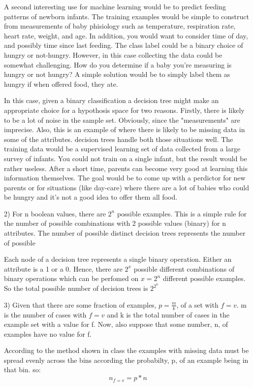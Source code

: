 \documentclass[12pt]{article}
\begin{document}
A second interesting use for machine learning would be to predict feeding patterns 
of newborn infants. The training examples would be simple to construct from measurements
of baby phisiology such as temperature, respiration rate, heart rate, weight, and age. 
In addition, you would want to consider time of day, and possibly time since last feeding. 
The class label could be a binary choice of hungry or not-hungry. However, in this case
collecting the data could be somewhat challenging. How do you determine if a baby you're 
measuring is hungry or not hungry? A simple solution would be to simply label them as hungry
if when offered food, they ate. 

In this case, given a binary classification a decision tree might make an appropriate 
choice for a hypothosis space for two reasons. Firstly, there is likely to be a lot of 
noise in the sample set. Obviously, since the "measurements" are imprecise. Also, 
this is an example of where there is likely to be missing data in some of the attributes. 
decision trees handle both those situations well. The training data would be a supervised
learning set of data collected from a large survey of infants. You could not train on a 
single infant, but the result would be rather useless. After a short time, parents can 
become very good at learning this information themselves. The goal would be to come 
up with a perdictor for new parents or for situations (like day-care) where there are a 
lot of babies who could be hungry and it's not a good idea to offer them all food. 

2) For n boolean values, there are $2^n$ possible examples. This is a simple rule for
the number of possible combinations with 2 possible values (binary) for n attributes. 
The number of possible distinct decision trees represents the number of possible 

Each node of a decision tree represents a single binary operation. Either an attribute is
a 1 or a 0. Hence, there are $2^{x}$ possible different combinations of binary operations 
which can be perfomed on $x=2^n$ different possible examples. So the total possible number 
of decision trees is $2^{2^n}$

3) Given that there are some fraction of examples, $p=\frac{m}{k}$, of a set with $f=v$. m is 
the number of cases with $f=v$ and k is the total number of cases in the example set with a value
for f. Now, also suppose that some number, n, of examples have no value for f.

According to the method shown in class the examples with missing data must be 
spread evenly across the bins according the probabilty, p, of an example being in that bin. 
so: 
\begin{equation}
    n_{f=v} = p*n 
\end{equation}
\end{document}
